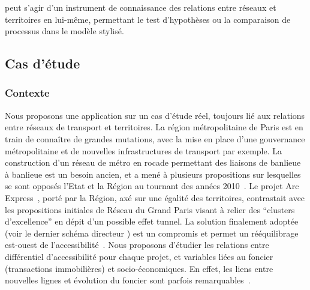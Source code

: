 \documentclass[english]{./sageo}
\begin{document}
peut s'agir d'un instrument de connaissance des relations entre réseaux et territoires en lui-même, permettant le test d'hypothèses ou la comparaison de processus dans le modèle stylisé.







\subsection{Cas d'étude}


\subsubsection{Contexte}

Nous proposons une application sur un cas d'étude réel, toujours lié aux relations entre réseaux de transport et territoires. La région métropolitaine de Paris est en train de connaître de grandes mutations, avec la mise en place d'une gouvernance métropolitaine et de nouvelles infrastructures de transport par exemple. La construction d'un réseau de métro en rocade permettant des liaisons de banlieue à banlieue est un besoin ancien, et a mené à plusieurs propositions sur lesquelles se sont opposés l'Etat et la Région au tournant des années 2010~\cite{desjardins2010bataille}. Le projet Arc Express~\cite{stif2007arc}, porté par la Région, axé sur une égalité des territoires, contrastait avec les propositions initiales de Réseau du Grand Paris visant à relier des ``clusters d'excellence'' en dépit d'un possible effet tunnel. La solution finalement adoptée (voir le dernier schéma directeur \cite{sdrif2013}) est un compromis et permet un rééquilibrage est-ouest de l'accessibilité~\cite{beaucire2013grand}. Nous proposons d'étudier les relations entre différentiel d'accessibilité pour chaque projet, et variables liées au foncier (transactions immobilières) et socio-économiques. En effet, les liens entre nouvelles lignes et évolution du foncier sont parfois remarquables~\cite{damm1980response}.
\end{document}
